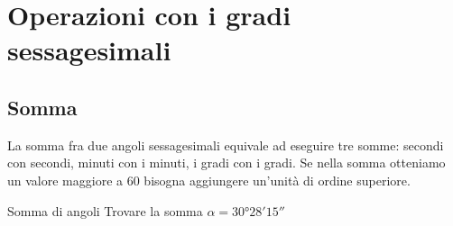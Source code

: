 \section{Operazioni con i gradi sessagesimali}
\subsection{Somma}
La somma fra due angoli sessagesimali equivale ad eseguire  tre somme: secondi con secondi, minuti con i minuti, i gradi con i gradi. Se nella somma otteniamo un valore maggiore a $60$ bisogna aggiungere un'unità di ordine superiore.
\begin{esempiot}{Somma di angoli}{}
	Trovare la somma $\alpha=\ang{30;28;15}$
\end{esempiot}